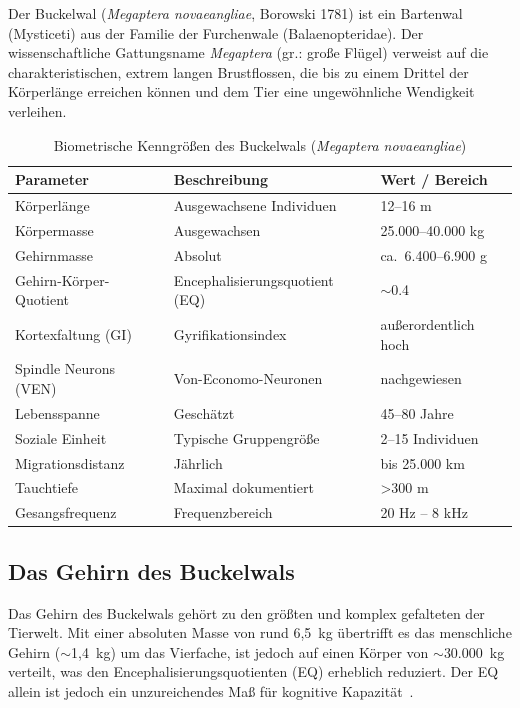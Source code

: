 ﻿\documentclass[12pt,a4paper]{article}
\theoremstyle{definition}
\theoremstyle{remark}
\begin{document}
Der Buckelwal (\textit{Megaptera novaeangliae}, Borowski 1781) ist ein
Bartenwal (Mysticeti) aus der Familie der Furchenwale (Balaenopteridae). Der
wissenschaftliche Gattungsname \textit{Megaptera} (gr.: große Flügel)
verweist auf die charakteristischen, extrem langen Brustflossen, die bis zu
einem Drittel der Körperlänge erreichen können und dem Tier eine ungewöhnliche
Wendigkeit verleihen.

\begin{table}[h]
  \centering
  \caption{Biometrische Kenngrößen des Buckelwals (\textit{Megaptera novaeangliae})}
  \label{tab:biometrie}
  \begin{tabularx}{\textwidth}{lXl}
    \toprule
    \textbf{Parameter} & \textbf{Beschreibung} & \textbf{Wert / Bereich} \\
    \midrule
    Körperlänge & Ausgewachsene Individuen & 12--16 m \\
    Körpermasse & Ausgewachsen & 25.000--40.000 kg \\
    Gehirnmasse & Absolut & ca.\ 6.400--6.900 g \\
    Gehirn-Körper-Quotient & Encephalisierungsquotient (EQ) & $\sim$0.4 \\
    Kortexfaltung (GI) & Gyrifikationsindex & außerordentlich hoch \\
    Spindle Neurons (VEN) & Von-Economo-Neuronen & nachgewiesen \\
    Lebensspanne & Geschätzt & 45--80 Jahre \\
    Soziale Einheit & Typische Gruppengröße & 2--15 Individuen \\
    Migrations\-distanz & Jährlich & bis 25.000 km \\
    Tauchtiefe & Maximal dokumentiert & >300 m \\
    Gesangsfrequenz & Frequenzbereich & 20 Hz -- 8 kHz \\
    \bottomrule
  \end{tabularx}
\end{table}

\subsection{Das Gehirn des Buckelwals}

Das Gehirn des Buckelwals gehört zu den größten und komplex gefalteten der
Tierwelt. Mit einer absoluten Masse von rund 6,5~kg übertrifft es das
menschliche Gehirn ($\sim$1,4~kg) um das Vierfache, ist jedoch auf einen
Körper von $\sim$30.000~kg verteilt, was den Encephalisierungsquotienten
(EQ) erheblich reduziert. Der EQ allein ist jedoch ein unzureichendes Maß für
kognitive Kapazität~\cite{roth2005evolution}.
\end{document}

